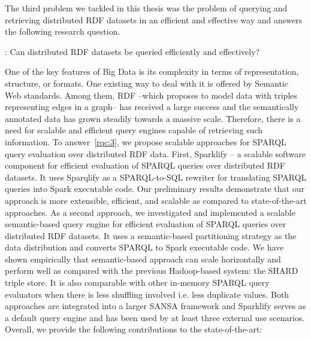 The third problem we tackled in this thesis was the problem of querying and retrieving distributed \gls{RDF} datasets in an efficient and effective way and answers the following research question.

\begin{tcolorbox}
\textbf{\rqNr[RQ3]\label{rqc:3}}: Can distributed \gls{RDF} datasets be queried efficiently and effectively?
\end{tcolorbox}

One of the key features of Big Data is its complexity in terms of representation, structure, or formats.
One existing way to deal with it is offered by Semantic Web standards.
Among them, \gls{RDF} --which proposes to model data with triples representing edges in a graph-- has received a large success and the semantically annotated data has grown steadily towards a massive scale.
Therefore, there is a need for scalable and efficient query engines capable of retrieving such information.
To answer~\ref{rqc:3}, we propose scalable approaches for \gls{SPARQL} query evaluation over distributed \gls{RDF} data. 
First, Sparklify -- a scalable software component for efficient evaluation of \gls{SPARQL} queries over distributed \gls{RDF} datasets. 
It uses Sparqlify as a SPARQL-to-SQL rewriter for translating SPARQL queries into Spark executable code.
Our preliminary results demonstrate that our approach is more extensible, efficient, and scalable as compared to state-of-the-art approaches.
As a second approach, we investigated and implemented a scalable semantic-based query engine for efficient evaluation of \gls{SPARQL} queries over distributed \gls{RDF} datasets. 
It uses a semantic-based partitioning strategy as the data distribution and converts \gls{SPARQL} to Spark executable code.
We have shown empirically that semantic-based approach can scale horizontally and perform well as compared with the previous Hadoop-based system: the SHARD triple store.
It is also comparable with other in-memory \gls{SPARQL} query evaluators when there is less shuffling involved i.e. less duplicate values.
Both approaches are integrated into a larger SANSA framework and Sparklify serves as a default query engine and has been used by at least three external use scenarios.
Overall, we provide the following contributions to the state-of-the-art:

